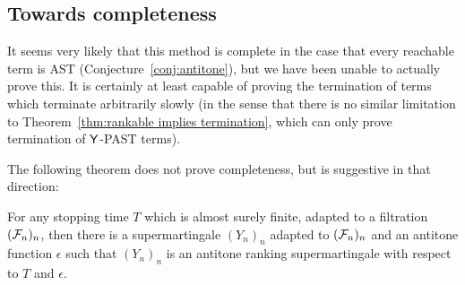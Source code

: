 \subsection{Towards completeness}
It seems very likely that this method is complete in the case that every reachable term is AST (Conjecture~\ref{conj:antitone}), but we have been unable to actually prove this. It is certainly at least capable of proving the termination of terms which terminate arbitrarily slowly (in the sense that there is no similar limitation to Theorem~\ref{thm:rankable implies termination}, which can only prove termination of $\mathsf{Y}$-PAST terms).

The following theorem does not prove completeness, but is suggestive in that direction:
\begin{therm}
\label{thm:towards completeness supermartingales}
For any stopping time $T$ which is almost surely finite, adapted to a filtration $(\mathcal{F}_n)_n$, then there is a supermartingale $(Y_n)_n$ adapted to $(\mathcal{F}_n)_n$ and an antitone function $\epsilon$ such that $(Y_n)_n$ is an antitone ranking supermartingale with respect to $T$ and $\epsilon$.
\end{therm}

